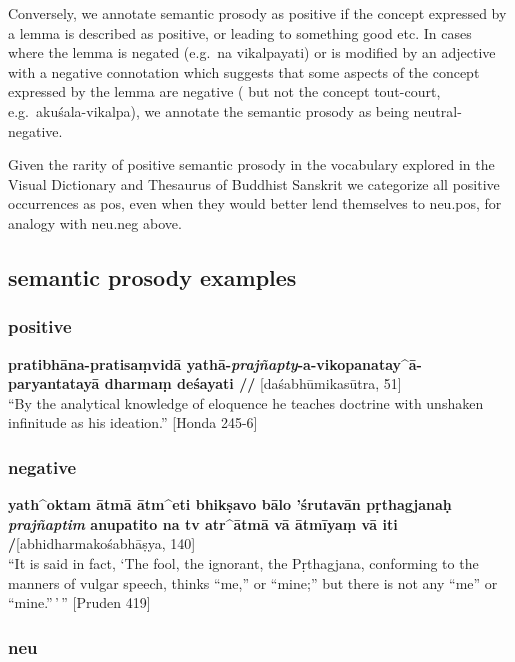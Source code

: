 \documentclass[
  letterpaper,
  DIV=11,
  numbers=noendperiod,
  oneside]{scrreprt}
\begin{document}
Conversely, we annotate semantic prosody as positive if the concept
expressed by a lemma is described as positive, or leading to something
good etc. In cases where the lemma is negated (e.g.~na vikalpayati) or
is modified by an adjective with a negative connotation which suggests
that some aspects of the concept expressed by the lemma are negative (
but not the concept tout-court, e.g.~akuśala-vikalpa), we annotate the
semantic prosody as being neutral-negative.

Given the rarity of positive semantic prosody in the vocabulary explored
in the Visual Dictionary and Thesaurus of Buddhist Sanskrit we
categorize all positive occurrences as pos, even when they would better
lend themselves to neu.pos, for analogy with neu.neg above.

\hypertarget{semantic-prosody-examples}{%
\subsection{semantic prosody examples}\label{semantic-prosody-examples}}

\hypertarget{sec-examplesemprospos}{%
\subsubsection{positive}\label{sec-examplesemprospos}}

\textbf{pratibhāna-pratisaṃvidā
yathā-\emph{prajñapty}-a-vikopanatay\^{}ā-paryantatayā dharmaṃ deśayati
//} {[}daśabhūmikasūtra, 51{]}\\
``By the analytical knowledge of eloquence he teaches doctrine with
unshaken infinitude as his ideation.'' {[}Honda 245-6{]}

\hypertarget{sec-examplesemprosneg}{%
\subsubsection{negative}\label{sec-examplesemprosneg}}

\textbf{yath\^{}oktam ātmā ātm\^{}eti bhikṣavo bālo 'śrutavān
pṛthagjanaḥ \emph{prajñaptim} anupatito na tv atr\^{}ātmā vā ātmīyaṃ vā
iti /}{[}abhidharmakośabhāṣya, 140{]}\\
``It is said in fact, `The fool, the ignorant, the Pṛthagjana,
conforming to the manners of vulgar speech, thinks ``me,'' or ``mine;''
but there is not any ``me'' or ``mine.''\,'\,'' {[}Pruden 419{]}

\hypertarget{sec-examplesemprosneu}{%
\subsubsection{neu}\label{sec-examplesemprosneu}}
\end{document}
